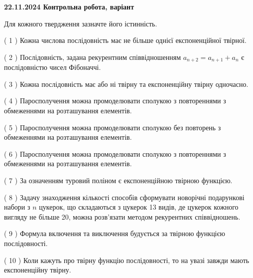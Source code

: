 \documentclass[12pt, ukrainian]{article}
\begin{document}
\vspace{4mm}
\newpage
\begin {large}

\textbf{22.11.2024 Контрольна робота, варіант  }\par


{
Для кожного твердження зазначте його істинність.\par
\vspace{2mm}
( 1 ) Кожна числова послідовність має не більше однієї  експоненційної твірної.%

( 2 ) Послідовність, задана рекурентним співвідношенням $a_{n+2}=a_{n+1}+a_{n}$ є послідовністю чисел Фібоначчі.%

( 3 ) Кожна послідовність має або ні твірну та експоненційну твірну одночасно.%

( 4 ) Паросполучення можна промоделювати сполукою з повтореннями з обмеженнями на розташування елементів.%

( 5 ) Паросполучення можна промоделювати сполукою без повторень з обмеженнями на розташування елементів.%

( 6 ) Паросполучення можна промоделювати сполукою з повтореннями з обмеженнями на розташування елементів.%

( 7 ) За означенням туровий поліном є експоненційною твірною функцією.%

( 8 ) Задачу знаходження кількості способів сформувати новорічні подарункові набори з $n$ цукерок, що складаються з цукерок 13 видів, де цукерок кожного вигляду не більше 20, можна розв’язати методом рекурентних співвідношень.%

( 9 ) Формула включення та виключення будується за твірною функцією послідовності.%

( 10 ) Коли кажуть про твірну функцію послідовності, то на увазі завжди мають експоненційну твірну.%


\vspace{5mm}
}
\end {large}

\vspace{4mm}
\newpage
\end{document}
